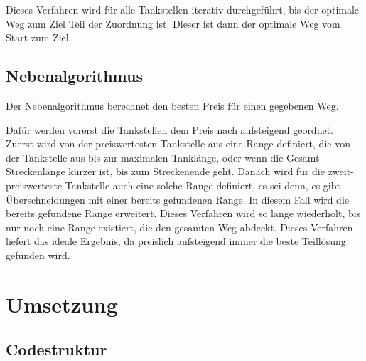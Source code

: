 \documentclass[a4paper,10pt,ngerman]{scrartcl}
\begin{document}
Dieses Verfahren wird für alle Tankstellen iterativ durchgeführt, bis der optimale Weg zum Ziel Teil der Zuordnung ist. Dieser ist dann der optimale Weg vom Start zum Ziel.

\subsection{Nebenalgorithmus}

Der Nebenalgorithmus berechnet den besten Preis für einen gegebenen Weg. 

Dafür werden vorerst die Tankstellen dem Preis nach aufsteigend geordnet. Zuerst wird von der preiswertesten Tankstelle aus eine Range definiert, die von der Tankstelle aus bis zur maximalen Tanklänge, oder wenn die Gesamt-Streckenlänge kürzer ist, bis zum Streckenende geht. Danach wird für die zweit-preiswerteste Tankstelle auch eine solche Range definiert, es sei denn, es gibt Überschneidungen mit einer bereits gefundenen Range. In diesem Fall wird die bereits gefundene Range erweitert. Dieses Verfahren wird so lange wiederholt, bis nur noch eine Range existiert, die den gesamten Weg abdeckt. Dieses Verfahren liefert das ideale Ergebnis, da preislich aufsteigend immer die beste Teillösung gefunden wird. 

\newpage

\section{Umsetzung}

\subsection{Codestruktur}
\end{document}
